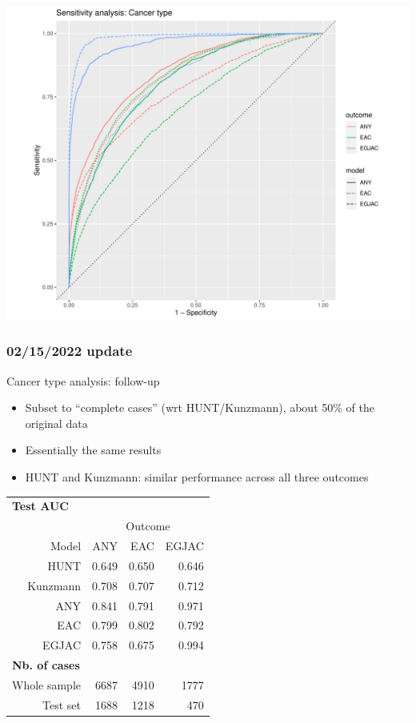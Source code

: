 \documentclass[12pt]{article}
\begin{document}
\begin{center}
\includegraphics[width=\textwidth]{sensitivity_cancertype/roc_curves_outcome_model.pdf}
\end{center}



\pagebreak
\subsubsection*{02/15/2022 update}

Cancer type analysis: follow-up
\begin{itemize}
	\item Subset to ``complete cases'' (wrt HUNT/Kunzmann), about 50\%
	of the original data
	\item Essentially the same results
	\item HUNT and Kunzmann: similar performance across all three outcomes
\end{itemize}


\begin{table}[ht]
\centering
\begin{tabular}{rrrr}
  \toprule
  \multicolumn{4}{l}{\textbf{Test AUC}}\\
  & \multicolumn{3}{c}{Outcome}\\ \cmidrule(l){2-4}
Model & ANY & EAC & EGJAC \\ 
  \midrule
HUNT & 0.649 & 0.650 & 0.646 \\ 
  Kunzmann & 0.708 & 0.707 & 0.712 \\ 
  \addlinespace
  ANY & 0.841 & 0.791 & 0.971 \\ 
  EAC & 0.799 & 0.802 & 0.792 \\ 
  EGJAC & 0.758 & 0.675 & 0.994 \\ 
  \midrule
  \multicolumn{4}{l}{\textbf{Nb. of cases}}\\\addlinespace
  Whole sample & 6687 & 4910 & 1777 \\
  Test set & 1688 & 1218 &  470 \\ 
   \bottomrule
\end{tabular}
\end{table}
\end{document}
